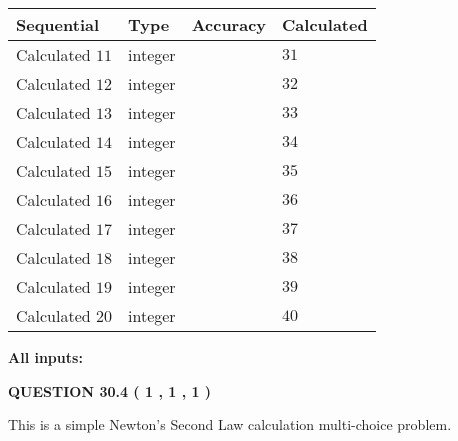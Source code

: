 \documentclass[12pt]{article}
\begin{document}
  
\noindent\begin{tabular}{|l|l|l|l|}
\hline
 Sequential & Type & Accuracy & Calculated \\ 
\hline
 
 
  Calculated $           11 $ & integer &  & 
  $ 31 $ 
 \\  \hline  
 
 
  Calculated $           12 $ & integer &  & 
  $ 32 $ 
 \\  \hline  
 
 
  Calculated $           13 $ & integer &  & 
  $ 33 $ 
 \\  \hline  
 
 
  Calculated $           14 $ & integer &  & 
  $ 34 $ 
 \\  \hline  
 
 
  Calculated $           15 $ & integer &  & 
  $ 35 $ 
 \\  \hline  
 
 
  Calculated $           16 $ & integer &  & 
  $ 36 $ 
 \\  \hline  
 
 
  Calculated $           17 $ & integer &  & 
  $ 37 $ 
 \\  \hline  
 
 
  Calculated $           18 $ & integer &  & 
  $ 38 $ 
 \\  \hline  
 
 
  Calculated $           19 $ & integer &  & 
  $ 39 $ 
 \\  \hline  
 
 
  Calculated $           20 $ & integer &  & 
  $ 40 $ 
 \\  \hline  
 \end{tabular}
   
   
   
   
\noindent\vspace{0.1in}\hspace{-0.08in} {\textbf{\Large{All inputs: }}}
   
   
  
\vspace{0.2in}
  
{\textbf{\Large{QUESTION
30.4 
 (           1 ,           1 ,           1 )
}}}
  
  


\noindent{}
This is a simple Newton's Second Law calculation multi-choice problem.  
\noindent{}
\end{document}
